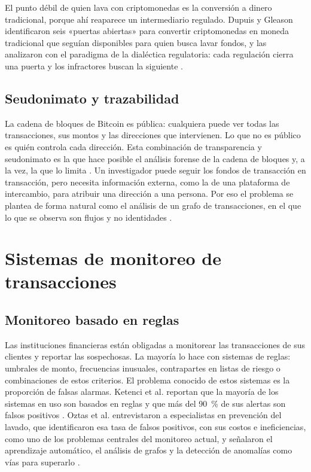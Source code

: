 El punto débil de quien lava con criptomonedas es la conversión a dinero tradicional, porque
ahí reaparece un intermediario regulado. Dupuis y Gleason identificaron seis «puertas abiertas»
para convertir criptomonedas en moneda tradicional que seguían disponibles para quien busca
lavar fondos, y las analizaron con el paradigma de la dialéctica regulatoria: cada regulación
cierra una puerta y los infractores buscan la siguiente \cite{Dupuis2020OpenDoors}.

\subsection{Seudonimato y trazabilidad}

La cadena de bloques de Bitcoin es pública: cualquiera puede ver todas las transacciones,
sus montos y las direcciones que intervienen. Lo que no es público es quién controla cada
dirección. Esta combinación de transparencia y seudonimato es la que hace posible el análisis
forense de la cadena de bloques y, a la vez, la que lo limita \cite{Pocher2023Anomalous}. Un
investigador puede seguir los fondos de transacción en transacción, pero necesita información
externa, como la de una plataforma de intercambio, para atribuir una dirección a una persona. Por
eso el problema se plantea de forma natural como el análisis de un grafo de transacciones, en
el que lo que se observa son flujos y no identidades \cite{Weber2019Elliptic}.

\section{Sistemas de monitoreo de transacciones}\label{sec:ctx_monitoreo}

\subsection{Monitoreo basado en reglas}

Las instituciones financieras están obligadas a monitorear las transacciones de sus clientes y
reportar las sospechosas. La mayoría lo hace con sistemas de reglas: umbrales de monto,
frecuencias inusuales, contrapartes en listas de riesgo o combinaciones de estos criterios. El
problema conocido de estos sistemas es la proporción de falsas alarmas. Ketenci et al.
reportan que la mayoría de los sistemas en uso son basados en reglas y que más del 90~\% de sus
alertas son falsos positivos \cite{Ketenci2021TimeFrequency}. Oztas et al. entrevistaron a
especialistas en prevención del lavado, que identificaron esa tasa de falsos positivos, con sus
costos e ineficiencias, como uno de los problemas centrales del monitoreo actual, y señalaron el
aprendizaje automático, el análisis de grafos y la detección de anomalías como vías para
superarlo \cite{Oztas2024Monitoring}.

